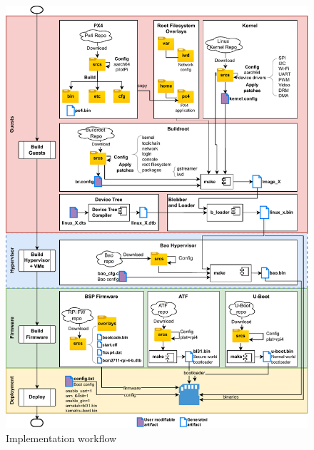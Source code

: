 \begin{figure}[!hbt]
  \centering
  \includegraphics[width=1.0\textwidth]{./img/pdf/uav-main-Implem-Workflow}
  \caption{Implementation workflow}%
  \label{fig:uav-main-Implem-Workflow}
\end{figure}

